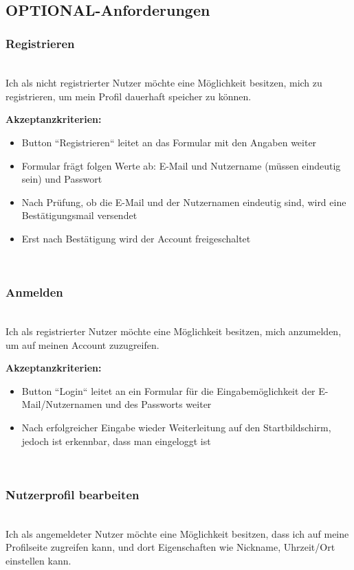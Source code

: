 \documentclass[conference]{IEEEtran}
\begin{document}
\ \\

	\subsection{OPTIONAL-Anforderungen}
	\subsubsection{Registrieren}
	\ \\
	Ich als nicht registrierter Nutzer möchte eine Möglichkeit besitzen, mich zu registrieren, um mein Profil dauerhaft speicher zu können.
	
	\textbf{Akzeptanzkriterien:}
	\begin{itemize}
		\item Button ``Registrieren`` leitet an das Formular mit den Angaben weiter
		\item Formular frägt folgen Werte ab: E-Mail und Nutzername (müssen eindeutig sein) und Passwort
		\item Nach Prüfung, ob die E-Mail und der Nutzernamen eindeutig sind, wird eine Bestätigungsmail versendet
		\item Erst nach Bestätigung wird der Account freigeschaltet
	\end{itemize}
	
	\ \\
	\subsubsection{Anmelden}
	\ \\
	Ich als registrierter Nutzer möchte eine Möglichkeit besitzen, mich anzumelden, um auf meinen Account zuzugreifen.
	
	\textbf{Akzeptanzkriterien:}
	\begin{itemize}
		\item Button ``Login`` leitet an ein Formular für die Eingabemöglichkeit der E-Mail/Nutzernamen und des Passworts weiter
		\item Nach erfolgreicher Eingabe wieder Weiterleitung auf den Startbildschirm, jedoch ist erkennbar, dass man eingeloggt ist
	\end{itemize}
	
	\ \\
	\subsubsection{Nutzerprofil bearbeiten}
	\ \\
	Ich als angemeldeter Nutzer möchte eine Möglichkeit besitzen, dass ich auf meine Profilseite zugreifen kann, und dort Eigenschaften wie Nickname, Uhrzeit/Ort einstellen kann.
	
\end{document}
